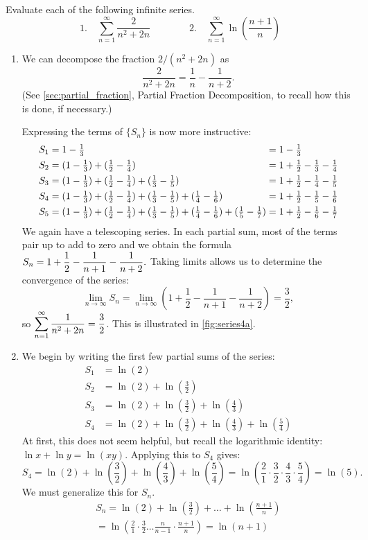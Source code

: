\begin{example}\label{ex_series4}%
Evaluate each of the following infinite series.
\[
 \text{1.}\quad\sum_{n=1}^\infty \frac{2}{n^2+2n}\qquad\qquad
 \text{2.}\quad\sum_{n=1}^\infty \ln\left(\frac{n+1}{n}\right)
\]
\solution
\begin{enumerate}
\item		We can decompose the fraction $2/(n^2+2n)$ as
\[\frac2{n^2+2n} = \frac1n-\frac1{n+2}.\]
(See \autoref{sec:partial_fraction}, Partial Fraction Decomposition, to recall how  this is done, if necessary.)

Expressing the terms of $\{S_n\}$ is now more instructive:%
{%
\small%
\begin{align*}
S_1 &= 1-\tfrac13 &&= 1-\tfrac13\\
S_2 &= (1-\tfrac13) + (\tfrac12-\tfrac14) &&= 1+\tfrac12-\tfrac13-\tfrac14\\
S_3 &= (1-\tfrac13) + (\tfrac12-\tfrac14) + (\tfrac13-\tfrac15)
&&= 1+\tfrac12-\tfrac14-\tfrac15\\
S_4 &= (1-\tfrac13) + (\tfrac12-\tfrac14) + (\tfrac13-\tfrac15) + (\tfrac14-\tfrac16)
&&= 1+\tfrac12-\tfrac15-\tfrac16\\
S_5 &= (1-\tfrac13) + (\tfrac12-\tfrac14) + (\tfrac13-\tfrac15) + (\tfrac14-\tfrac16) + (\tfrac15-\tfrac17)\mkern-18mu
&&= 1+\tfrac12-\tfrac16-\tfrac17
\end{align*}}%
We again have a telescoping series. In each partial sum, most of the terms pair up to add to zero and we obtain the formula $\displaystyle S_n = 1+\frac12-\frac1{n+1}-\frac1{n+2}.$ Taking limits allows us to determine the convergence of the series:
\[
\lim_{n\to\infty}S_n
= \lim_{n\to\infty} \left(1+\frac12-\frac1{n+1}-\frac1{n+2}\right) = \frac32,
\]
so $\displaystyle\sum_{n=1}^\infty \frac1{n^2+2n} = \frac32$.
This is illustrated in \autoref{fig:series4a}.

\item	We begin by writing the first few partial sums of the series:
\begin{align*}
S_1 &= \ln\left(2\right) \\
S_2 &= \ln\left(2\right)+\ln\left(\frac32\right) \\
S_3 &= \ln\left(2\right)+\ln\left(\frac32\right)+\ln\left(\frac43\right) \\
S_4 &= \ln\left(2\right)+\ln\left(\frac32\right)+\ln\left(\frac43\right)
+\ln\left(\frac54\right) 
\end{align*}
At first, this does not seem helpful, but recall the logarithmic identity: $\ln x+\ln y = \ln (xy).$ Applying this to $S_4$ gives:
\[
S_4 = \ln\left(2\right)+\ln\left(\frac32\right)+\ln\left(\frac43\right)
+\ln\left(\frac54\right)
=\ln\left(\frac21\cdot\frac32\cdot\frac43\cdot\frac54\right)
=\ln\left(5\right).
\]
We must generalize this for $S_n$.
\begin{multline*}
S_n=\ln\left(2\right)+\ln\left(\frac32\right)+\dots +\ln \left(\frac{n+1}{n}\right)\\
=\ln\left(\frac21\cdot\frac32 \dots  \frac{n}{n-1}\cdot \frac{n+1}{n}\right)
=\ln(n+1)
\end{multline*}


\end{enumerate}
\end{example}
